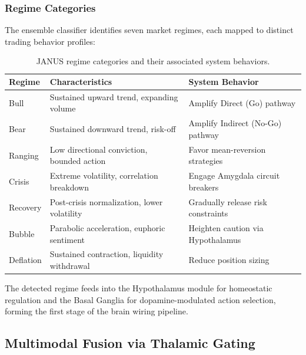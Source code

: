 \documentclass[12pt, a4paper]{article}
\begin{document}
\subsubsection{Regime Categories}
\label{sec:regime_categories}

The ensemble classifier identifies seven market regimes, each mapped to distinct trading behavior profiles:

\begin{table}[htbp]
	\centering
	\small
	\begin{tabularx}{\textwidth}{|l|L|L|}
		\hline
		\textbf{Regime} & \textbf{Characteristics}                    & \textbf{System Behavior}           \\
		\hline
		Bull            & Sustained upward trend, expanding volume    & Amplify Direct (Go) pathway        \\
		\hline
		Bear            & Sustained downward trend, risk-off          & Amplify Indirect (No-Go) pathway   \\
		\hline
		Ranging         & Low directional conviction, bounded action  & Favor mean-reversion strategies    \\
		\hline
		Crisis          & Extreme volatility, correlation breakdown   & Engage Amygdala circuit breakers   \\
		\hline
		Recovery        & Post-crisis normalization, lower volatility & Gradually release risk constraints \\
		\hline
		Bubble          & Parabolic acceleration, euphoric sentiment  & Heighten caution via Hypothalamus  \\
		\hline
		Deflation       & Sustained contraction, liquidity withdrawal & Reduce position sizing             \\
		\hline
	\end{tabularx}
	\caption{JANUS regime categories and their associated system behaviors.}
	\label{tab:regime_categories}
\end{table}

The detected regime feeds into the Hypothalamus module for homeostatic regulation and the Basal Ganglia for dopamine-modulated action selection, forming the first stage of the brain wiring pipeline.

\subsection{Multimodal Fusion via Thalamic Gating}
\label{sec:thalamus}
\end{document}
